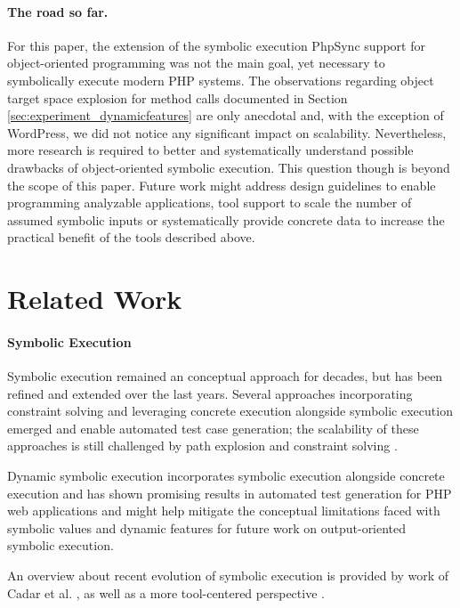 \documentclass[sigconf, preprint]{acmart}
\renewcommand{\sf}[1]{\textsf{#1}}
\begin{document}
\paragraph{The road so far.}
For this paper, the extension of the symbolic execution \sf{PhpSync} \cite{Nguyen:2014:BCG:2635868.2635928}
support for object-oriented programming was not the main goal, yet necessary to
symbolically execute modern PHP systems. The observations regarding object
target space explosion for method calls documented in Section
\ref{sec:experiment_dynamicfeatures} are only anecdotal and, with the exception
of \sf{WordPress}, we did not notice any significant impact on scalability.
Nevertheless, more research is required to better and systematically understand
possible drawbacks of object-oriented symbolic execution. 
This question though is beyond the scope of this paper.
Future work might address design guidelines to enable programming analyzable applications, tool support to scale
the number of assumed symbolic inputs or systematically provide concrete data
to increase the practical benefit of the tools described above.


\section{Related Work} \label{sec:related_work}

\paragraph{Symbolic Execution}
Symbolic execution \cite{King1976,Darringer1978} remained an conceptual approach
for decades, but has been refined and extended over the last years. Several
approaches incorporating constraint solving and leveraging concrete execution
alongside symbolic execution emerged and enable automated test case generation;
the scalability of these approaches is still challenged by path explosion and constraint solving \cite{CadarSen2013}. 

Dynamic symbolic execution \cite{CadarSen2013} incorporates symbolic execution
alongside concrete execution and has shown promising results in automated test
generation\cite{artzi_finding_2008,artzi_finding_2010,DynamicWassermann} for PHP web
applications and might help mitigate the conceptual limitations faced with
symbolic values and dynamic features for future work on output-oriented
symbolic execution.

An overview about recent evolution of symbolic execution is provided by work of Cadar et al.
\cite{CadarSen2013}, as well as a more tool-centered perspective \cite{Cadar2011}.
\end{document}
